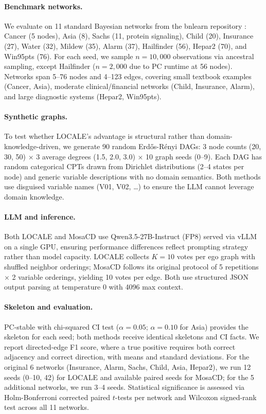 \documentclass{article} %
\begin{document}
\paragraph{Benchmark networks.} We evaluate on 11 standard Bayesian networks from the bnlearn repository \citep{chen2024mosacd}: Cancer (5 nodes), Asia (8), Sachs (11, protein signaling), Child (20), Insurance (27), Water (32), Mildew (35), Alarm (37), Hailfinder (56), Hepar2 (70), and Win95pts (76). For each seed, we sample $n{=}10{,}000$ observations via ancestral sampling, except Hailfinder ($n{=}2{,}000$ due to PC runtime at 56 nodes). Networks span 5--76 nodes and 4--123 edges, covering small textbook examples (Cancer, Asia), moderate clinical/financial networks (Child, Insurance, Alarm), and large diagnostic systems (Hepar2, Win95pts).

\paragraph{Synthetic graphs.} To test whether LOCALE's advantage is structural rather than domain-knowledge-driven, we generate 90 random Erd\H{o}s-R\'{e}nyi DAGs: 3 node counts (20, 30, 50) $\times$ 3 average degrees (1.5, 2.0, 3.0) $\times$ 10 graph seeds (0--9). Each DAG has random categorical CPTs drawn from Dirichlet distributions (2--4 states per node) and generic variable descriptions with no domain semantics. Both methods use disguised variable names (V01, V02, \ldots) to ensure the LLM cannot leverage domain knowledge.

\paragraph{LLM and inference.} Both LOCALE and MosaCD use Qwen3.5-27B-Instruct (FP8) served via vLLM on a single GPU, ensuring performance differences reflect prompting strategy rather than model capacity. LOCALE collects $K{=}10$ votes per ego graph with shuffled neighbor orderings; MosaCD follows its original protocol of 5 repetitions $\times$ 2 variable orderings, yielding 10 votes per edge. Both use structured JSON output parsing at temperature 0 with 4096 max context.

\paragraph{Skeleton and evaluation.} PC-stable \citep{colombo2014order} with chi-squared CI test ($\alpha{=}0.05$; $\alpha{=}0.10$ for Asia) provides the skeleton for each seed; both methods receive identical skeletons and CI facts. We report directed-edge F1 score, where a true positive requires both correct adjacency and correct direction, with means and standard deviations. For the original 6 networks (Insurance, Alarm, Sachs, Child, Asia, Hepar2), we run 12 seeds (0--10, 42) for LOCALE and available paired seeds for MosaCD; for the 5 additional networks, we run 3--4 seeds. Statistical significance is assessed via Holm-Bonferroni corrected paired $t$-tests per network and Wilcoxon signed-rank test across all 11 networks.
\end{document}
